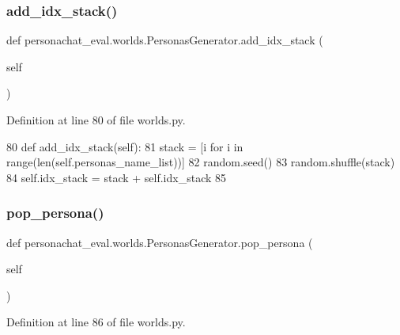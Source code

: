 \subsubsection{\texorpdfstring{add\+\_\+idx\+\_\+stack()}{add\_idx\_stack()}}
{\footnotesize\ttfamily def personachat\+\_\+eval.\+worlds.\+Personas\+Generator.\+add\+\_\+idx\+\_\+stack (\begin{DoxyParamCaption}\item[{}]{self }\end{DoxyParamCaption})}



Definition at line 80 of file worlds.\+py.


\begin{DoxyCode}
80     \textcolor{keyword}{def }add\_idx\_stack(self):
81         stack = [i \textcolor{keywordflow}{for} i \textcolor{keywordflow}{in} range(len(self.personas\_name\_list))]
82         random.seed()
83         random.shuffle(stack)
84         self.idx\_stack = stack + self.idx\_stack
85 
\end{DoxyCode}
\mbox{\label{classpersonachat__eval_1_1worlds_1_1PersonasGenerator_ac73e52e318d64155bf0812768f0e3fa3}} 
\subsubsection{\texorpdfstring{pop\+\_\+persona()}{pop\_persona()}}
{\footnotesize\ttfamily def personachat\+\_\+eval.\+worlds.\+Personas\+Generator.\+pop\+\_\+persona (\begin{DoxyParamCaption}\item[{}]{self }\end{DoxyParamCaption})}



Definition at line 86 of file worlds.\+py.


